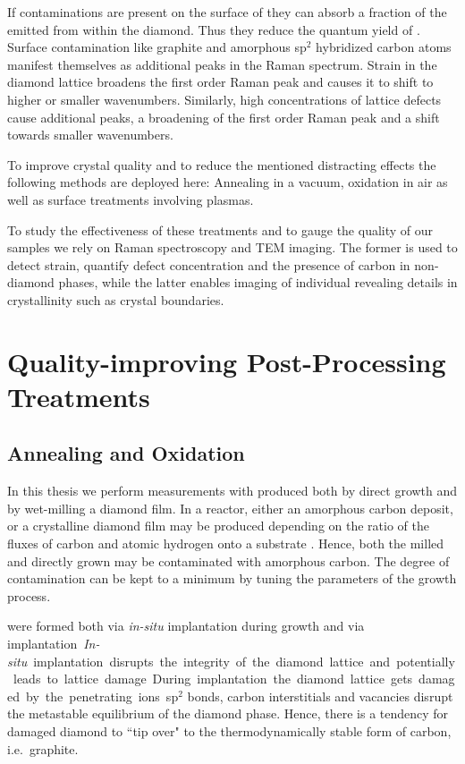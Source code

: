 		If contaminations are present on the surface of \nds they can absorb a fraction of the \fl emitted from within the diamond. Thus they reduce the quantum yield of \sivs. 
		Surface contamination like graphite and amorphous sp$^2$ hybridized carbon atoms manifest themselves as additional peaks in the Raman spectrum.
		Strain in the diamond lattice broadens the first order Raman peak and causes it to shift to higher or smaller wavenumbers.
		Similarly, high concentrations of lattice defects cause additional peaks, a broadening of the first order Raman peak and a shift towards smaller wavenumbers.
		
		To improve crystal quality and to reduce the mentioned distracting effects the following methods are deployed here: Annealing in a vacuum, oxidation in air as well as surface treatments involving plasmas.
		
		To study the effectiveness of these treatments and to gauge the quality of our \nd samples we rely on Raman spectroscopy and TEM imaging. The former is used to detect strain, quantify defect concentration and the presence of carbon in non-diamond phases, while the latter enables imaging of individual \nds revealing details in crystallinity such as crystal boundaries.

		\section{Quality-improving Post-Processing Treatments}

			\subsection{Annealing and Oxidation}\label{subsec::ann_ox}

				In this thesis we perform measurements with \nds produced both by direct \CVD growth and by wet-milling a \CVD diamond film.
				In a \cvd reactor, either an amorphous carbon deposit, or a crystalline diamond film may be produced depending on the ratio of the fluxes of carbon and atomic hydrogen onto a substrate \cite{Ford1995,Olson1993}.
				Hence, both the milled and directly grown \nds may be contaminated with amorphous carbon.
				The degree of contamination can be kept to a minimum by tuning the parameters of the growth process.
				
				\sivs were formed both via \textit{in-situ} implantation during \CVD growth and via \si implantation.
				\textit{In-situ} implantation disrupts the integrity of the diamond lattice and potentially leads to lattice damage.
				During \si implantation the diamond lattice gets damaged by the penetrating ions.
				sp$^2$ bonds, carbon interstitials and vacancies disrupt the metastable equilibrium of the diamond phase.
				Hence, there is a tendency for damaged diamond to ``tip over" to the thermodynamically stable form of carbon, i.e.\ graphite.
				
